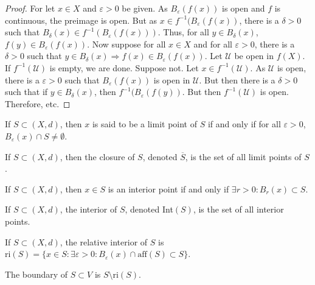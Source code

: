            \begin{proof}
            For let $x\in X$ and $\varepsilon>0$ be given. As $B_{\varepsilon}(f(x))$ is open and $f$ is continuous, the preimage is open. But as $x\in f^{-1}(B_{\varepsilon}(f(x))$, there is a $\delta>0$ such that $B_{\delta}(x)\in f^{-1}(B_{\varepsilon}(f(x)))$. Thus, for all $y \in B_{\delta}(x)$, $f(y) \in B_{\varepsilon}(f(x))$. Now suppose for all $x\in X$ and for all $\varepsilon>0$, there is a $\delta>0$ such that $y\in B_{\delta}(x)\Rightarrow f(x) \in B_{\varepsilon}(f(x))$. Let $\mathcal{U}$ be open in $f(X)$. If $f^{-1}(\mathcal{U})$ is empty, we are done. Suppose not. Let $x\in f^{-1}(\mathcal{U})$. As $\mathcal{U}$ is open, there is a $\varepsilon>0$ such that $B_{\varepsilon}(f(x))$ is open in $\mathcal{U}$. But then there is a $\delta>0$ such that if $y\in B_{\delta}(x)$, then $f^{-1}(B_{\varepsilon}(f(y))$. But then $f^{-1}(\mathcal{U})$ is open. Therefore, etc.
            \end{proof}
            \begin{definition}
            If $S\subset (X,d)$, then $x$ is said to be a limit point of $S$ if and only if for all $\varepsilon>0$, $B_{\varepsilon}(x)\cap S \ne \emptyset$.
            \end{definition}
            \begin{definition}
            If $S\subset (X,d)$, then the closure of $S$, denoted $\overline{S}$, is the set of all limit points of $S$.
            \end{definition}
            \begin{definition}
            If $S\subset (X,d)$, then $x\in S$ is an interior point if and only if $\exists r>0:B_{r}(x)\subset S$.
            \end{definition}
            \begin{definition}
            If $S\subset (X,d)$, the interior of $S$, denoted Int$(S)$, is the set of all interior points.
            \end{definition}
            \begin{definition}
            If $S\subset (X,d)$, the relative interior of $S$ is $\textrm{ri}(S)= \{x\in S:\exists \varepsilon>0:B_{\varepsilon}(x)\cap \textrm{aff}(S)\subset S\}$.
            \end{definition}
            \begin{definition}
            The boundary of $S\subset V$ is $S\setminus \textrm{ri}(S)$.
            \end{definition}
